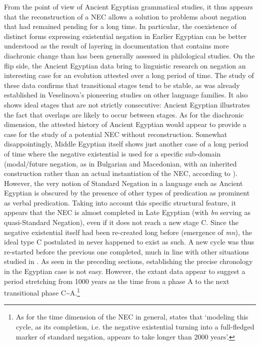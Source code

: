 \documentclass[output=paper,draft,draftmode,colorlinks,citecolor=brown]{langscibook}
\begin{document}
From the point of view of Ancient Egyptian grammatical studies, it thus appears that the reconstruction of a NEC allows a solution to problems about negation that had remained pending for a long time. In particular, the coexistence of distinct forms expressing existential negation in Earlier Egyptian can be better understood as the result of layering in documentation that contains more diachronic change than has been generally assessed in philological studies. On the flip side, the Ancient Egyptian data bring to linguistic research on negation an interesting case for an evolution attested over a long period of time. The study of these data confirms that transitional stages tend to be stable, as was already established in Veselinova’s pioneering studies on other language families. It also shows ideal stages that are not strictly consecutive: Ancient Egyptian illustrates the fact that overlaps are likely to occur between stages. As for the diachronic dimension, the attested history of Ancient Egyptian would appear to provide a case for the study of a potential NEC without reconstruction. Somewhat disappointingly, Middle Egyptian itself shows just another case of a long period of time where the negative existential is used for a specific sub-domain (modal/future negation, as in Bulgarian and Macedonian, with an inherited construction rather than an actual instantiation of the NEC, according to \citealt{Veselinova2014}). However, the very notion of Standard Negation in a language such as Ancient Egyptian is obscured by the presence of other types of predication as prominent as verbal predication. Taking into account this specific structural feature, it appears that the NEC is almost completed in Late Egyptian (with \textit{bn} serving as quasi-Standard Negation), even if it does not reach a new stage C. Since the negative existential itself had been re-created long before (emergence of \textit{mn}), the ideal type C postulated in \citet{Croft1991} never happened to exist as such. A new cycle was thus re-started before the previous one completed, much in line with other situations studied in \citet{Veselinova2016}. As seen in the preceding sections, establishing the precise chronology in the Egyptian case is not easy. However, the extant data appear to suggest a period stretching from 1000 years as the time from a phase A to the next transitional phase C{\textasciitilde}A.\footnote{As for the time dimension of the NEC in general, \citet[1327]{Veselinova2014} states that ‘modeling this cycle, as its completion, i.e. the negative existential turning into a full-fledged marker of standard negation, appears to take longer than 2000 years’. }
 
\end{document}
